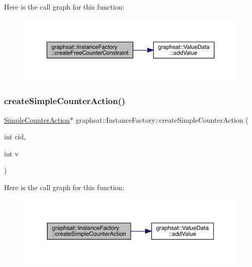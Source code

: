 Here is the call graph for this function\+:
\nopagebreak
\begin{figure}[H]
\begin{center}
\leavevmode
\includegraphics[width=350pt]{classgraphsat_1_1_instance_factory_a5549e171c6cfd167f94ad16b35989391_cgraph}
\end{center}
\end{figure}
\mbox{\label{classgraphsat_1_1_instance_factory_a999723c91c8a562def330b2498f26fa8}} 
\subsubsection{\texorpdfstring{createSimpleCounterAction()}{createSimpleCounterAction()}}
{\footnotesize\ttfamily \mbox{\hyperlink{classgraphsat_1_1_simple_counter_action}{Simple\+Counter\+Action}}$\ast$ graphsat\+::\+Instance\+Factory\+::create\+Simple\+Counter\+Action (\begin{DoxyParamCaption}\item[{int}]{cid,  }\item[{int}]{v }\end{DoxyParamCaption})\hspace{0.3cm}{\ttfamily [inline]}}

Here is the call graph for this function\+:
\nopagebreak
\begin{figure}[H]
\begin{center}
\leavevmode
\includegraphics[width=350pt]{classgraphsat_1_1_instance_factory_a999723c91c8a562def330b2498f26fa8_cgraph}
\end{center}
\end{figure}
\mbox{\label{classgraphsat_1_1_instance_factory_a1c7c11da85acdf5b5a1078a50b808f97}} 
